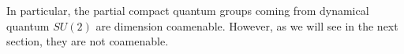  In particular, the partial compact quantum groups coming from
 dynamical quantum $SU(2)$ are dimension coamenable. However, as we
 will see in the next section, they are not coamenable.


